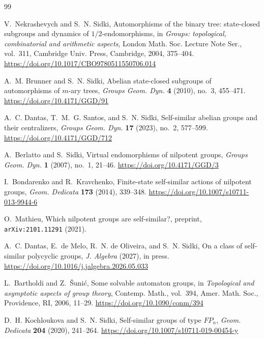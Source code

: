 \documentclass[draft]{adm-paper}
\theoremstyle{definition}
\begin{document}
\begin{thebibliography}{99}

  V.~Nekrashevych and S.~N. Sidki,
  Automorphisms of the binary tree: state-closed subgroups and dynamics of $1/2$-endomorphisms,
  in \emph{Groups: topological, combinatorial and arithmetic aspects},
  London Math. Soc. Lecture Note Ser., vol.~311, Cambridge Univ. Press, Cambridge, 2004, 375--404.
  \url{https://doi.org/10.1017/CBO9780511550706.014}

  A.~M. Brunner and S.~N. Sidki,
  Abelian state-closed subgroups of automorphisms of $m$-ary trees,
  \emph{Groups Geom. Dyn.} \textbf{4} (2010), no.~3, 455--471.
  \url{https://doi.org/10.4171/GGD/91}

  A.~C. Dantas, T.~M.~G. Santos, and S.~N. Sidki,
  Self-similar abelian groups and their centralizers,
  \emph{Groups Geom. Dyn.} \textbf{17} (2023), no.~2, 577--599.
  \url{https://doi.org/10.4171/GGD/712}

  A.~Berlatto and S.~Sidki,
  Virtual endomorphisms of nilpotent groups,
  \emph{Groups Geom. Dyn.} \textbf{1} (2007), no.~1, 21--46.
  \url{https://doi.org/10.4171/GGD/3}

  I.~Bondarenko and R.~Kravchenko,
  Finite-state self-similar actions of nilpotent groups,
  \emph{Geom. Dedicata} \textbf{173} (2014), 339--348.
  \url{https://doi.org/10.1007/s10711-013-9944-6}

  O.~Mathieu,
  Which nilpotent groups are self-similar?,
  preprint, \texttt{arXiv:2101.11291} (2021).

  A.~C. Dantas, E.~de Melo, R.~N. de Oliveira, and S.~N. Sidki,
  On a class of self-similar polycyclic groups,
  \emph{J. Algebra} (2027), in press.
  \url{https://doi.org/10.1016/j.jalgebra.2026.05.033}

  L.~Bartholdi and Z.~\v{S}uni\'c,
  Some solvable automaton groups,
  in \emph{Topological and asymptotic aspects of group theory},
  Contemp. Math., vol.~394, Amer. Math. Soc., Providence, RI, 2006, 11--29.
  \url{https://doi.org/10.1090/conm/394}

  D.~H. Kochloukova and S.~N. Sidki,
  Self-similar groups of type $FP_n$,
  \emph{Geom. Dedicata} \textbf{204} (2020), 241--264.
  \url{https://doi.org/10.1007/s10711-019-00454-y}


\end{thebibliography}
\end{document}
